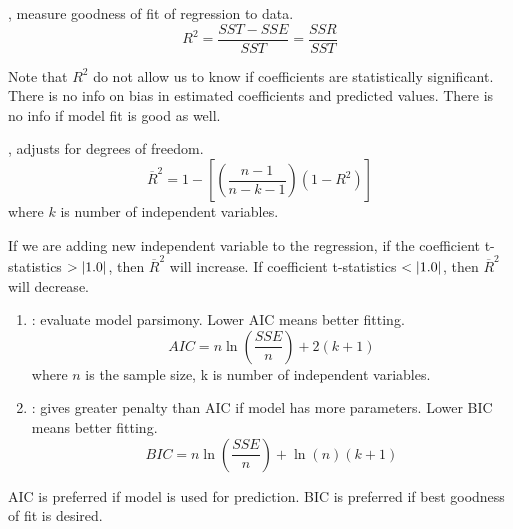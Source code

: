 \begin{definition} , measure goodness of fit of regression to data.
\begin{equation}
R^2 = \frac{SST - SSE}{SST} = \frac{SSR}{SST} \nonumber
\end{equation}
\end{definition}

Note that $R^2$ do not allow us to know if coefficients are statistically significant. There is no info on bias in estimated coefficients and predicted values. There is no info if model fit is good as well.

\begin{definition} , adjusts for degrees of freedom.
\begin{equation}
\overline{R}^2 = 1 - \left[\left(\frac{n-1}{n-k-1} \right) (1-R^2) \right] \nonumber
\end{equation}
where $k$ is number of independent variables.
\end{definition}

If we are adding new independent variable to the regression, if the coefficient t-statistics $> \left\lvert1.0\right\rvert$, then $\overline{R}^2$ will increase. If coefficient t-statistics $< \left\lvert1.0\right\rvert$, then $\overline{R}^2$ will decrease.

\begin{definition} 
\begin{enumerate}[label=\roman*.]
\setlength{\itemsep}{0pt}
\item {}: evaluate model parsimony. Lower AIC means better fitting.
\begin{equation}
AIC = n \ln(\frac{SSE}{n}) + 2(k+1) \nonumber
\end{equation}
where $n$ is the sample size, k is number of independent variables.
\item {}: gives greater penalty than AIC if model has more parameters. Lower BIC means better fitting.
\begin{equation}
BIC = n \ln(\frac{SSE}{n}) + \ln(n)(k+1) \nonumber
\end{equation}
\end{enumerate}
\end{definition}

AIC is preferred if model is used for prediction. BIC is preferred if best goodness of fit is desired.

